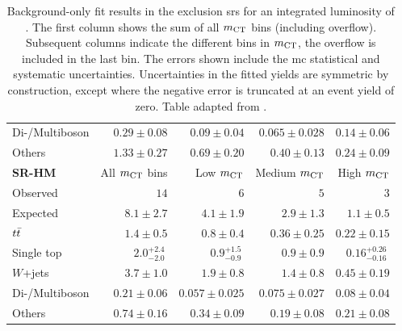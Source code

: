 \begin{table}
\begin{center}
{\begin{tabular}{lrrrr}
Di-/Multiboson          & $0.29 \pm 0.08$          & $0.09 \pm 0.04$          & $0.065 \pm 0.028$          & $0.14 \pm 0.06$              \\
Others          & $1.33 \pm 0.27$          & $0.69 \pm 0.20$          & $0.40 \pm 0.13$          & $0.24 \pm 0.09$              \\
\bottomrule
\textbf{ SR-HM}           & All $m_{\textrm{CT}}$ bins          & Low $m_{\textrm{CT}}$         & Medium $m_{\textrm{CT}}$        & High $m_{\textrm{CT}}$    \\[-0.05cm]
\midrule
Observed           & $14$              & $6$              & $5$              & $3$                    \\
\midrule
 Expected          & $8.1 \pm 2.7$          & $4.1 \pm 1.9$          & $2.9 \pm 1.3$          & $1.1 \pm 0.5$              \\
\midrule
         $t\bar{t}$          & $1.4 \pm 0.5$          & $0.8 \pm 0.4$          & $0.36 \pm 0.25$          & $0.22 \pm 0.15$              \\
Single top          & $2.0_{-2.0}^{+2.4}~$          & $0.9_{-0.9}^{+1.5}~$         & $0.9 \pm 0.9$          & $0.16_{-0.16}^{+0.26}~$              \\
$W$+jets           & $3.7 \pm 1.0$          & $1.9 \pm 0.8$          & $1.4 \pm 0.8$          & $0.45 \pm 0.19$              \\
Di-/Multiboson          & $0.21 \pm 0.06$          & $0.057 \pm 0.025$          & $0.075 \pm 0.027$          & $0.08 \pm 0.04$              \\
Others          & $0.74 \pm 0.16$          & $0.34 \pm 0.09$          & $0.19 \pm 0.08$          & $0.21 \pm 0.08$              \\
\bottomrule
\end{tabular}
}
\end{center}
\caption{ Background-only fit results in the exclusion \glspl{sr} for an integrated luminosity of \onethirtynineifb. The first column shows the sum of all $m_{\textrm{CT}}$ bins (including overflow). Subsequent columns indicate the different bins in $m_{\textrm{CT}}$, the overflow is included in the last bin. The errors shown include the \gls{mc} statistical and systematic uncertainties. Uncertainties in the fitted yields are symmetric by construction, except where the negative error is truncated at an event yield of zero.
Table adapted from \cite{SUSY-2019-08}.}\label{tab:results_bkg_only_SR}
\end{table}
%

